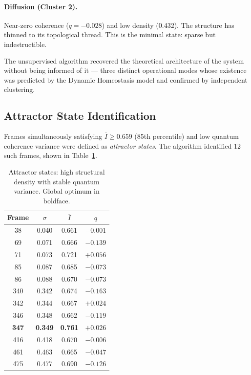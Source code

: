 \documentclass[twocolumn,amsmath,amssymb,prl]{revtex4-2}
\begin{document}
\paragraph{Diffusion (Cluster 2).}  Near-zero coherence ($q = -0.028$) and
low density (0.432).  The structure has thinned to its topological thread.
This is the minimal state: sparse but indestructible.

The unsupervised algorithm recovered the theoretical architecture of the
system without being informed of it — three distinct operational modes whose
existence was predicted by the Dynamic Homeostasis model and confirmed by
independent clustering.

\subsection{Attractor State Identification}

Frames simultaneously satisfying $\overline{I} \geq 0.659$ (85th percentile)
and low quantum coherence variance were defined as \emph{attractor states}.
The algorithm identified 12 such frames, shown in Table~\ref{tab:attractors}.

\begin{table}[h]
\centering
\caption{Attractor states: high structural density with stable quantum
  variance.  Global optimum in boldface.}
\label{tab:attractors}
\begin{tabular}{cccc}
\toprule
Frame & $\sigma$ & $\overline{I}$ & $q$ \\
\midrule
38  & 0.040 & 0.661 & $-0.001$ \\
69  & 0.071 & 0.666 & $-0.139$ \\
71  & 0.073 & 0.721 & $+0.056$ \\
85  & 0.087 & 0.685 & $-0.073$ \\
86  & 0.088 & 0.670 & $-0.073$ \\
340 & 0.342 & 0.674 & $-0.163$ \\
342 & 0.344 & 0.667 & $+0.024$ \\
346 & 0.348 & 0.662 & $-0.119$ \\
\textbf{347} & \textbf{0.349} & \textbf{0.761} & $+0.026$ \\
416 & 0.418 & 0.670 & $-0.006$ \\
461 & 0.463 & 0.665 & $-0.047$ \\
475 & 0.477 & 0.690 & $-0.126$ \\
\bottomrule
\end{tabular}
\end{table}
\end{document}
